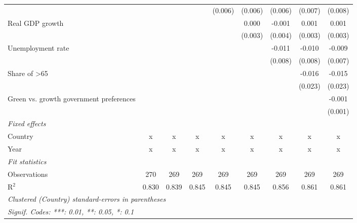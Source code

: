 \begin{table}[htbp]
\begin{tabular}{lcccccccc}
                                                      &         &         &         & (0.006) & (0.006) & (0.006) & (0.007) & (0.008)\\   
      Real GDP growth                                 &         &         &         &         & 0.000   & -0.001  & 0.001   & 0.001\\   
                                                      &         &         &         &         & (0.003) & (0.004) & (0.003) & (0.003)\\   
      Unemployment rate                               &         &         &         &         &         & -0.011  & -0.010  & -0.009\\   
                                                      &         &         &         &         &         & (0.008) & (0.008) & (0.007)\\   
      Share of >65                                    &         &         &         &         &         &         & -0.016  & -0.015\\   
                                                      &         &         &         &         &         &         & (0.023) & (0.023)\\   
      Green vs. growth government preferences         &         &         &         &         &         &         &         & -0.001\\   
                                                      &         &         &         &         &         &         &         & (0.001)\\   
      \emph{Fixed effects}\\
      Country                                         & x       & x       & x       & x       & x       & x       & x       & x\\  
      Year                                            & x       & x       & x       & x       & x       & x       & x       & x\\  
      \midrule \emph{Fit statistics}\\
      Observations                                    & 270     & 269     & 269     & 269     & 269     & 269     & 269     & 269\\  
      R$^2$                                           & 0.830   & 0.839   & 0.845   & 0.845   & 0.845   & 0.856   & 0.861   & 0.861\\  
      \midrule
      \multicolumn{9}{l}{\emph{Clustered (Country) standard-errors in parentheses}}\\
      \multicolumn{9}{l}{\emph{Signif. Codes: ***: 0.01, **: 0.05, *: 0.1}}\\
   \end{tabular}
\end{table}


